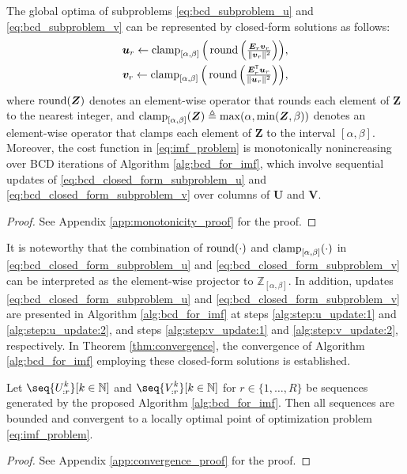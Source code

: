 \begin{theorem}[Monotonicity] \label{the:bcd_subproblem}
    The global optima of subproblems \eqref{eq:bcd_subproblem_u} and \eqref{eq:bcd_subproblem_v} can be represented by closed-form solutions as follows:
    \begin{align}
        \textstyle \bm{u}_r \gets \operatorname{clamp}_{[\alpha,\beta]}\Big(\operatorname{round}\Big(\frac{\bm{E}_r \bm{v}_r}{\lVert \bm{v}_r \rVert^2}\Big)\Big), \label{eq:bcd_closed_form_subproblem_u} \\
        \textstyle \bm{v}_r \gets \operatorname{clamp}_{[\alpha,\beta]}\Big(\operatorname{round}\Big(\frac{\bm{E}_r^\mathsf{T} \bm{u}_r}{\lVert \bm{u}_r \rVert^2}\Big)\Big),
        \label{eq:bcd_closed_form_subproblem_v}
    \end{align}
    where $\operatorname{round}(\bm{Z})$ denotes an element-wise operator that rounds each element of $\bm{Z}$ to the nearest integer, and $\operatorname{clamp}_{[\alpha,\beta]}(\bm{Z}) \triangleq \max(\alpha, \min(\bm{Z}, \beta))$ denotes an element-wise operator that clamps each element of $\bm{Z}$ to the interval $[\alpha,\beta]$. Moreover, the cost function in \eqref{eq:imf_problem} is monotonically nonincreasing over BCD iterations of Algorithm \ref{alg:bcd_for_imf}, which involve sequential updates of \eqref{eq:bcd_closed_form_subproblem_u} and \eqref{eq:bcd_closed_form_subproblem_v} over columns of $\bm U$ and $\bm V$.
\end{theorem}
\begin{proof}
    See Appendix \ref{app:monotonicity_proof} for the proof.
\end{proof}

It is noteworthy that the combination of $\operatorname{round}(\cdot)$ and $\operatorname{clamp}_{[\alpha,\beta]}(\cdot)$ in \eqref{eq:bcd_closed_form_subproblem_u} and \eqref{eq:bcd_closed_form_subproblem_v} can be interpreted as the element-wise projector to $\mathbb{Z}_{[\alpha,\beta]}$. In addition, updates \eqref{eq:bcd_closed_form_subproblem_u} and \eqref{eq:bcd_closed_form_subproblem_v} are presented in Algorithm \ref{alg:bcd_for_imf} at steps \ref{alg:step:u_update:1} and \ref{alg:step:u_update:2}, and steps \ref{alg:step:v_update:1} and \ref{alg:step:v_update:2}, respectively. In Theorem \ref{thm:convergence}, the convergence of Algorithm \ref{alg:bcd_for_imf} employing these closed-form solutions is established.

\begin{theorem}[Convergence]\label{thm:convergence}
    Let $\seq{\displaystyle U_{:r}^{k}}[k\in\N]$ and $\seq{\displaystyle V_{:r}^{k}}[k\in\N]$ for $r\in \{1,\dots,R\}$ be sequences generated by the proposed Algorithm \ref{alg:bcd_for_imf}. Then all sequences are bounded and convergent to a locally optimal point of optimization problem \eqref{eq:imf_problem}.
\end{theorem}
\begin{proof}
    See Appendix \ref{app:convergence_proof} for the proof.
\end{proof}

